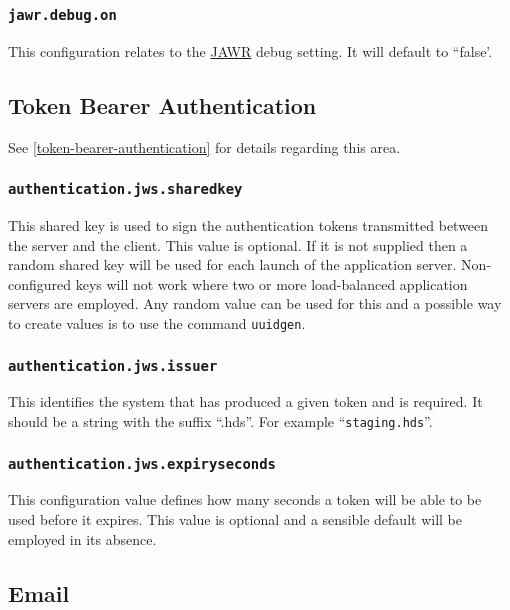 \subsubsection{\tt jawr.debug.on}

This configuration relates to the \href{https://jawr.java.net/}{JAWR} debug setting.  It will default to ``false'.

\subsection{Token Bearer Authentication}

See \ref{token-bearer-authentication} for details regarding this area.

\subsubsection{\tt authentication.jws.sharedkey}

This shared key is used to sign the authentication tokens transmitted between the server and the client.  This value is optional.  If it is not supplied then a random shared key will be used for each launch of the application server.  Non-configured keys will not work where two or more load-balanced application servers are employed.  Any random value can be used for this and a possible way to create values is to use the command {\tt uuidgen}.

\subsubsection{\tt authentication.jws.issuer}

This identifies the system that has produced a given token and is required.  It should be a string with the suffix ``.hds''.  For example ``{\tt staging.hds}''.

\subsubsection{\tt authentication.jws.expiryseconds}

This configuration value defines how many seconds a token will be able to be used before it expires.  This value is optional and a sensible default will be employed in its absence.

\subsection{Email}

